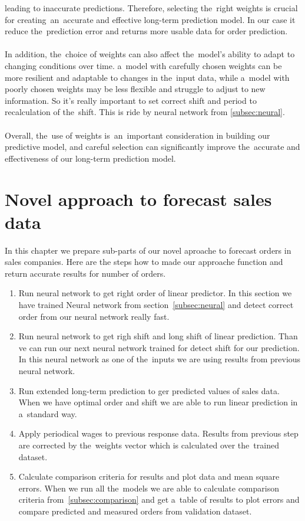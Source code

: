     leading to inaccurate predictions. Therefore, selecting the~right weights is crucial for creating~an~accurate and
    effective long-term prediction model. In our case it reduce the~prediction error and returns more usable
    data for order prediction.\\
    \\
    In addition, the~choice of weights can also affect the~model's ability to adapt to changing conditions over time.
    a~model with carefully chosen weights can be more resilient and adaptable to changes in the~input data,
    while a~model with poorly chosen weights may be less flexible and struggle to adjust to new information.
    So it's really important to set correct shift and period to recalculation of the~shift.
    This is ride by neural network from \ref{subsec:neural}.\\
    \\
    Overall, the~use of weights is~an~important consideration in building our predictive model, and careful selection
    can significantly improve the~accurate and effectiveness of our long-term prediction model.

    \section{Novel approach to forecast sales data}\label{subsec:combining_models}
    In this chapter we prepare sub-parts of our novel aproache to forecast orders in sales companies.
    Here are the steps how to made our approache function and return accurate results for number of orders.
    \begin{enumerate}
        \item Run neural network to get right order of linear predictor. In this section we have trained Neural network from section~\ref{subsec:neural} and detect correct order from our neural network really fast.
        \item Run neural network to get righ shift and long shift of linear prediction.
        Than ve can run our next neural network trained for detect shift for our prediction. In this neural network as one of the~inputs we are using results from previous neural network.
        \item Run extended long-term prediction to ger predicted values of sales data.
        When we have optimal order and shift we are able to run linear prediction in a~standard way.
        \item Apply periodical wages to previous response data.
        Results from previous step are corrected by the~weights vector which is calculated over the~trained dataset.
        \item Calculate comparison criteria for results and plot data and mean square errors.
        When we run all the~models we are able to calculate comparison criteria from~\ref{subsec:comparison} and
        get a~table of results to plot errors and compare predicted and measured orders from validation dataset.
    \end{enumerate}
